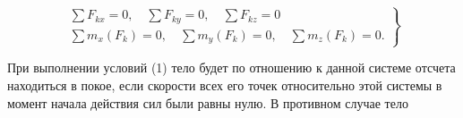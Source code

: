 \documentclass[10pt]{article}
\begin{document}
\[

\left.\begin{array}{l}

\sum F_{k x}=0, \quad \sum F_{k y}=0, \quad \sum F_{k z}=0 \\

\sum m_{x}\left(F_{k}\right)=0, \quad \sum m_{y}\left(F_{k}\right)=0, \quad \sum m_{z}\left(F_{k}\right)=0 .

\end{array}\right\}

\]



При выполнении условий (1) тело будет по отношению к данной системе отсчета находиться в покое, если скорости всех его точек относительно этой системы в момент начала действия сил были равны нулю. В противном случае тело
\end{document}
